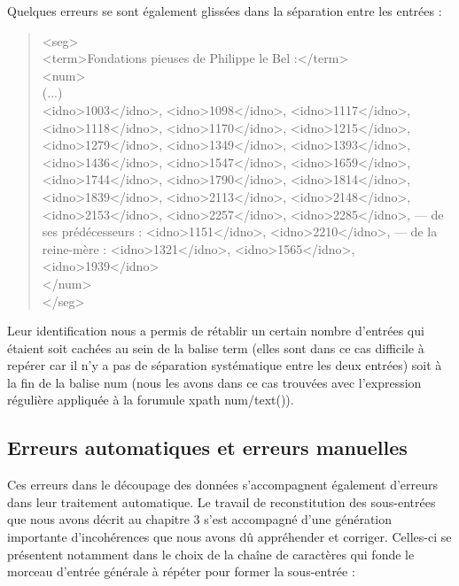 \documentclass[a4paper,12pt,twoside]{book}
\begin{document}
	Quelques erreurs se sont également glissées dans la séparation entre les entrées :
	
	\begin{quotation}
               	<seg>\\
					\indent\indent<term>Fondations pieuses de Philippe le Bel :</term>\\
					\indent\indent<num>\\
						\indent\indent\indent (...)\\
						\indent\indent\indent<idno>1003</idno>, <idno>1098</idno>, <idno>1117</idno>, 
						\indent\indent\indent <idno>1118</idno>, 
						<idno>1170</idno>, <idno>1215</idno>, 
						\indent\indent\indent <idno>1279</idno>, <idno>1349</idno>, 
						<idno>1393</idno>, 
						\indent\indent\indent <idno>1436</idno>, <idno>1547</idno>, <idno>1659</idno>,
						\indent\indent\indent <idno>1744</idno>, <idno>1790</idno>, <idno>1814</idno>, 
						\indent\indent\indent <idno>1839</idno>, 
						<idno>2113</idno>, <idno>2148</idno>, 
						\indent\indent\indent<idno>2153</idno>, <idno>2257</idno>, 
						<idno>2285</idno>,
						 \indent\indent\indent — de ses prédécesseurs : <idno>1151</idno>, <idno>2210</idno>, 
						 \indent\indent\indent — de la reine-mère : <idno>1321</idno>, <idno>1565</idno>, \indent\indent\indent<idno>1939</idno>\\
					\indent\indent</num>\\
				\indent</seg>
	\end{quotation}
	
	\noindent Leur identification nous a permis de rétablir un certain nombre d'entrées qui étaient soit cachées au sein de la balise \og term\fg{} (elles sont dans ce cas difficile à repérer car il n'y a pas de séparation systématique entre les deux entrées) soit à la fin de la balise \og num\fg{} (nous les avons dans ce cas trouvées avec l'expression régulière \og [A-Za-z]\fg{} appliquée à la forumule xpath \og num/text()\fg{}). 
	
	\subsection{Erreurs automatiques et erreurs manuelles}
	
	Ces erreurs dans le découpage des données s'accompagnent également d'erreurs dans leur traitement automatique. Le travail de reconstitution des sous-entrées que nous avons décrit au chapitre 3 s'est accompagné d'une génération importante d'incohérences que nous avons dû appréhender et corriger. Celles-ci se présentent notamment dans le choix de la chaîne de caractères qui fonde le morceau d'entrée générale à répéter pour former la sous-entrée :
	
\end{document}
